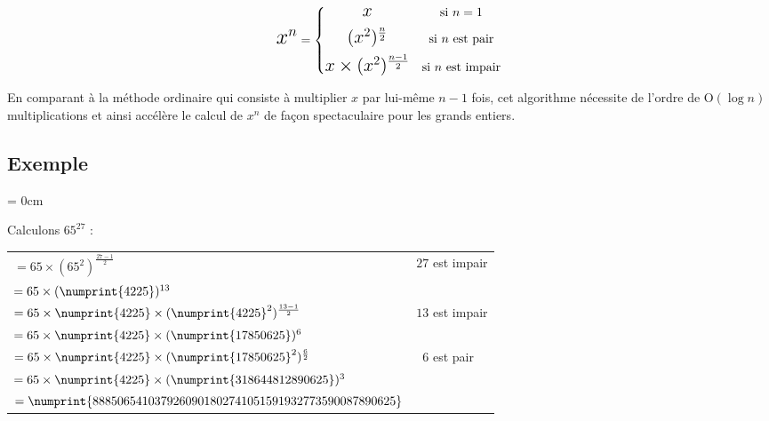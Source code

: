 \documentclass[a4paper, twoside]{article}
\begin{document}
	\vspace{-2mm}

		$${\mbox{{\LARGE $x^n$}}} = \left\{{   
		\begin{matrix}
		\vspace{2mm}
		{\mbox{{\Large $x$}}} & {\mbox{si $n = 1$}}\\
		\vspace{2mm}
		{\mbox{{\Large $(x^2)^{\frac{n}{2}}$}}} & {\mbox{si $n$ est pair}}\\
		{\mbox{{\Large $x \times (x^2)^{\frac{n-1}{2}}$}}} & {\mbox{si $n$ est impair}}\\
		\end{matrix}}\right.$$

	\vspace{2mm}

	En comparant à la méthode ordinaire qui consiste à multiplier $x$ par lui-même $n - 1$ fois, cet algorithme nécessite de l'ordre de $\mathrm{O}(\log n)$ multiplications et ainsi accélère le calcul de $x^n$ de façon spectaculaire pour les grands entiers.

	\vfill

	\subsection*{Exemple}

	{\parindent = 0cm

	Calculons $65^{27}$ :
	\vspace{0.2cm}

	\begin{large}
	\begin{tabular}{l|l}

	$= 65 \times (65^2)^{\frac{27-1}{2}}$ & \small $27$ est impair \\
	$= 65 \times (\numprint{4225})^{13}$ \\
	$= 65 \times \numprint{4225} \times (\numprint{4225}^2)^{\frac{13-1}{2}}$ & \small $13$ est impair \\
	$= 65 \times \numprint{4225} \times (\numprint{17850625})^{6}$ \\
	$= 65 \times \numprint{4225} \times (\numprint{17850625}^2)^{\frac{6}{2}}$ & \small $\phantom{0}6$ est pair \\
	$= 65 \times \numprint{4225} \times (\numprint{318644812890625})^{3}$ \\
	$= \numprint{8885065410379260901802741051591932773590087890625}$ \\

	\end{tabular}
	\end{large}
	}
\end{document}
